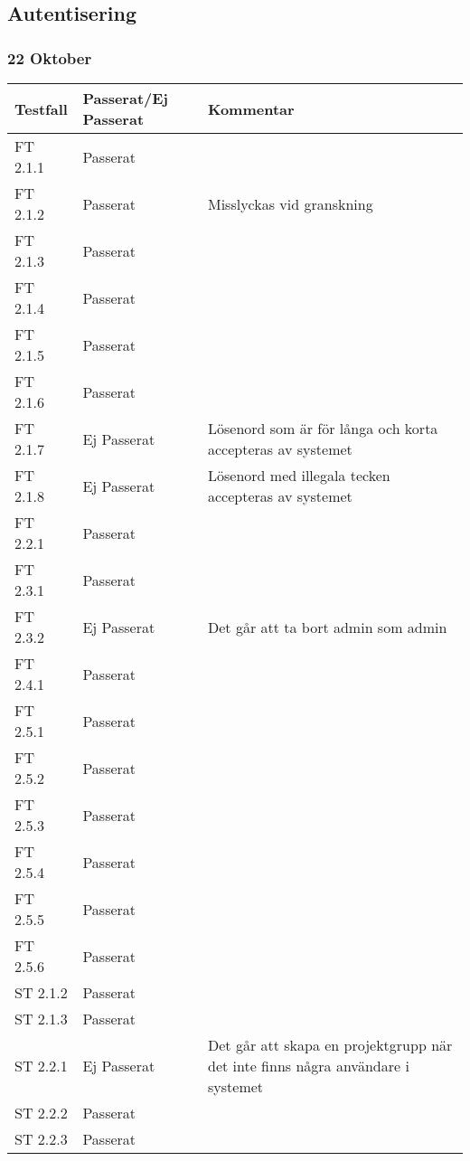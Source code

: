 \documentclass[a4paper]{article}
\begin{document}






\subsection{Autentisering}

\subsubsection{22 Oktober}
\begin{tabular}{| l | l | p{9cm} |}
\hline
Testfall &  Passerat/Ej Passerat & Kommentar\\
\hline
FT 2.1.1 & Passerat & \\
\hline
FT 2.1.2 & Passerat & Misslyckas vid granskning\\
\hline
FT 2.1.3 & Passerat & \\
\hline
FT 2.1.4 & Passerat & \\
\hline
FT 2.1.5 & Passerat & \\
\hline
FT 2.1.6 & Passerat & \\
\hline
FT 2.1.7 & Ej Passerat & Lösenord som är för långa och korta accepteras av systemet \\
\hline
FT 2.1.8 & Ej Passerat & Lösenord med illegala tecken accepteras av systemet \\
\hline
FT 2.2.1 & Passerat & \\
\hline
FT 2.3.1 & Passerat & \\
\hline
FT 2.3.2 & Ej Passerat & Det går att ta bort admin som admin\\
\hline
FT 2.4.1 & Passerat & \\
\hline
FT 2.5.1 & Passerat & \\
\hline
FT 2.5.2 & Passerat & \\
\hline
FT 2.5.3 & Passerat & \\
\hline
FT 2.5.4 & Passerat & \\
\hline
FT 2.5.5 & Passerat & \\
\hline
FT 2.5.6 & Passerat & \\
\hline
ST 2.1.2 & Passerat & \\
\hline
ST 2.1.3 & Passerat & \\
\hline
ST 2.2.1 & Ej Passerat & Det går att skapa en projektgrupp när det inte finns några användare i systemet\\
\hline
ST 2.2.2 & Passerat & \\
\hline
ST 2.2.3 & Passerat & \\
\hline
\end{tabular}
\end{document}
